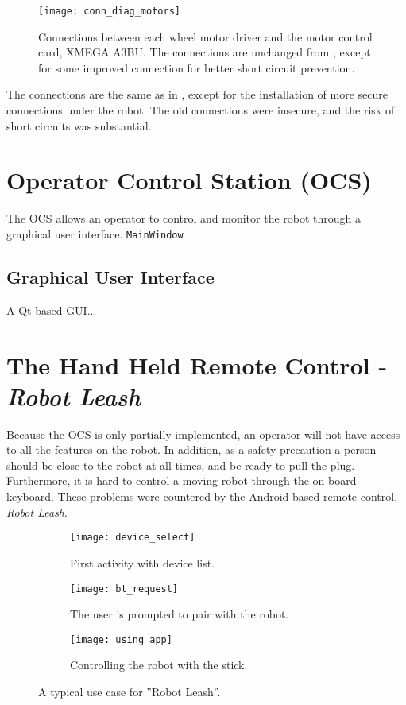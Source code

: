 \begin{figure}[p]
	\centering
	\texttt{[image: conn\_diag\_motors]}
	\caption{Connections between each wheel motor driver and the motor control card, XMEGA A3BU. The connections are unchanged from \cite{aspunvik}, except for some improved connection for better short circuit prevention.}
	\label{fig:conn_diag_motors}
\end{figure}


The connections are the same as in \cite{aspunvik}, except for the installation of more secure connections under the robot. The old connections were insecure, and the risk of short circuits was substantial.

\section{Operator Control Station (OCS)}

The \ac{OCS} allows an operator to control and monitor the robot through a graphical user interface. \texttt{MainWindow}

\subsection{Graphical User Interface}

A Qt-based \ac{GUI}...

\section{The Hand Held Remote Control - \textit{Robot Leash}}

Because the \ac{OCS} is only partially implemented, an operator will not have access to all the features on the robot. In addition, as a safety precaution a person should be close to the robot at all times, and be ready to pull the plug. Furthermore, it is hard to control a moving robot through the on-board keyboard. These problems were countered by the Android-based remote control, \textit{Robot Leash}. 


\begin{figure}
	\centering
	\begin{subfigure}[b]{0.30\textwidth}
		\texttt{[image: device\_select]}
		\caption{First activity with device list.}
		\label{fig:device_select}
	\end{subfigure}
		\begin{subfigure}[b]{0.30\textwidth}
			\texttt{[image: bt\_request]}
			\caption{The user is prompted to pair with the robot.}
			\label{fig:bt_request}
		\end{subfigure}
	\begin{subfigure}[b]{0.30\textwidth}
		\texttt{[image: using\_app]}
		\caption{Controlling the robot with the stick.}
		\label{fig:using_app}
	\end{subfigure}
	\caption{\label{fig:app_screens}A typical use case for ''Robot Leash''.}
\end{figure}

